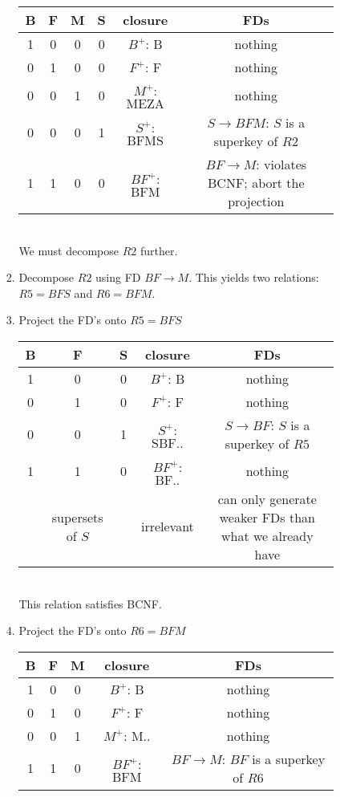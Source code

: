 \documentclass{csc_assignment2}
\begin{document}
\begin{description}
\begin{enumerate}
\begin{enumerate}
\begin{enumerate}
\begin{tabular}{ |c|c|c|c|c|c| } 
 \hline
 B & F & M & S & closure & FDs \\
 \hline
 1 & 0 & 0 & 0 & $B^{+}$: $\text{B}$ & nothing \\ 
 \hline
 0 & 1 & 0 & 0 & $F^{+}$: $\text{F}$ & nothing \\ 
 \hline
 0 & 0 & 1 & 0 & $M^{+}$: $\text{MEZA}$ & nothing \\ 
 \hline
 0 & 0 & 0 & 1 & $S^{+}$: $\text{BFMS}$ & $S \rightarrow BFM$: $S$ is a superkey of $R2$ \\ 
 \hline
 1 & 1 & 0 & 0 & $BF^{+}$: $\text{BFM}$ & $BF \rightarrow M$: violates BCNF; abort the projection \\ 
 \hline
\end{tabular} \\[3pt] We must decompose $R2$ further.
\item Decompose $R2$ using FD $BF \rightarrow M$. This yields two relations: $R5 = BFS$ and $R6 = BFM$.
\item Project the FD's onto $R5 = BFS$ \\[5pt]
\begin{tabular}{ |c|c|c|c|c| } 
 \hline
 B & F & S & closure & FDs \\
 \hline
 1 & 0 & 0 & $B^{+}$: $\text{B}$ & nothing \\ 
 \hline
 0 & 1 & 0 & $F^{+}$: $\text{F}$ & nothing \\ 
 \hline
 0 & 0 & 1 & $S^{+}$: $\text{SBF..}$ & $S \rightarrow BF$: $S$ is a superkey of $R5$ \\
 \hline
 1 & 1 & 0 & $BF^{+}$: $\text{BF..}$ & nothing \\
 \hline
 & supersets of $S$ && irrelevant & can only generate weaker FDs than what we already have \\
 \hline
\end{tabular} \\[3pt] This relation satisfies BCNF. 
\item Project the FD's onto $R6 = BFM$ \\[5pt]
\begin{tabular}{ |c|c|c|c|c| } 
 \hline
 B & F & M & closure & FDs \\
 \hline
 1 & 0 & 0 & $B^{+}$: $\text{B}$ & nothing \\ 
 \hline
 0 & 1 & 0 & $F^{+}$: $\text{F}$ & nothing \\ 
 \hline
 0 & 0 & 1 & $M^{+}$: $\text{M..}$ & nothing \\
 \hline
 1 & 1 & 0 & $BF^{+}$: $\text{BFM}$ & $BF \rightarrow M$: $BF$ is a superkey of $R6$ \\

\end{tabular}
\end{enumerate}
\end{enumerate}
\end{enumerate}
\end{description}
\end{document}
